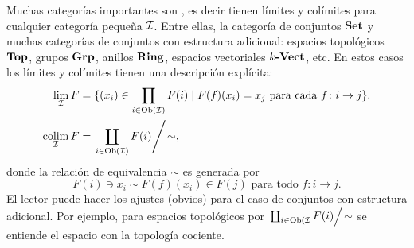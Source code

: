 \documentclass{article}
\numberwithin{equation}{section}
\theoremstyle{definition}
\begin{document}
\begin{ejemplo}
\end{ejemplo}

Muchas categorías importantes son , es decir
tienen límites y colímites para cualquier categoría pequeña
$\mathcal{I}$. Entre ellas, la categoría de conjuntos
$\text{\bf Set}$ y muchas categorías de conjuntos con estructura adicional:
espacios topológicos $\text{\bf Top}$, grupos
$\text{\bf Grp}$, anillos $\text{\bf Ring}$, espacios vectoriales
$k\text{\bf -Vect}$, etc. En estos casos los límites y colímites tienen una
descripción explícita:
\begin{align*}
  \lim_\mathcal{I} F & = \{ (x_i) \in \prod_{i\in \operatorname{Ob} (\mathcal{I})} F(i) \mid F (f) (x_i) = x_j \text{ para cada } f\colon i\to j \}.\\
  \operatorname*{co{\lim}}_\mathcal{I} F & = \left.\coprod_{i\in \operatorname{Ob} (\mathcal{I})} F (i) \right/\!\sim,
\end{align*}
donde la relación de equivalencia $\sim$ es generada por
$$F (i) \ni x_i \sim F(f) (x_i) \in F (j) \text{ para todo } f\colon i\to j.$$
El lector puede hacer los ajustes (obvios) para el caso de conjuntos con
estructura adicional. Por ejemplo, para espacios topológicos por
$\left.\coprod_{i\in \operatorname{Ob} (\mathcal{I}} F (i)
\right/\!\sim$ se entiende el espacio con la topología cociente.
\end{document}
